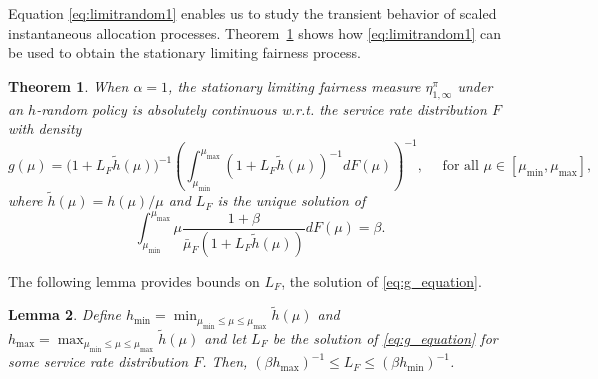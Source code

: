 \documentclass[a4paper,11pt,twoside]{article}
\numberwithin{equation}{section}
\numberwithin{figure}{section}
\theoremstyle{plain}
\newtheorem{theorem}{Theorem}[section]
\newtheorem{lemma}[theorem]{Lemma}
\newcommand{\CC}{\mathbb{C}}
\newcommand{\1}{\mathbbm{1}}
\begin{document}
Equation \eqref{eq:limitrandom1} enables us to study the transient behavior of scaled instantaneous allocation processes. Theorem~\ref{thm:stationary_fairness1} shows how \eqref{eq:limitrandom1} can be used to obtain the stationary limiting fairness process. 


\begin{theorem}
When $\alpha=1$, the stationary limiting fairness measure $\eta_{1,\infty}^\pi$ under an $h$-random policy is absolutely continuous w.r.t. the service rate distribution $F$ with density 
\begin{equation}
    g(\mu)=
    \big( 1+L_F\tilde{h}(\mu) \big)^{-1}
    \left(\int_{\mu_{\min}}^{\mu_{\max}}(1+L_F\tilde{h}(\mu))^{-1}dF(\mu)\right)^{-1},\quad \mbox{ for all }\mu\in[\mu_{\min},\mu_{\max}],\label{eq:stationaryfairness_hrandom}
\end{equation}
where $\tilde{h}(\mu)=h(\mu)/\mu$ and $L_F$ is the unique solution of
\begin{equation}
    \int_{\mu_{\min}}^{\mu_{\max}}\mu\frac{1+\beta}{\bar{\mu}_F(1+L_F\tilde{h}(\mu))}dF(\mu)=\beta.\label{eq:g_equation}
\end{equation}
\label{thm:stationary_fairness1}
\end{theorem}
\vspace{-0.4in}
The following lemma provides bounds on $L_F$, the solution of \eqref{eq:g_equation}.
\begin{lemma}\label{lem:L_bound}
Define $h_{\min}=\min_{\mu_{\min} \leq \mu\leq \mu_{\max} }\tilde{h}(\mu)$ and $h_{\max}=\max_{\mu_{\min}\leq \mu\leq \mu_{\max}}\tilde{h}(\mu)$ and let $L_F$ be the solution of \eqref{eq:g_equation} for some service rate distribution $F$. Then, $(\beta h_{\max})^{-1}\leq L_F\leq (\beta h_{\min})^{-1}$.
\end{lemma}
\end{document}
